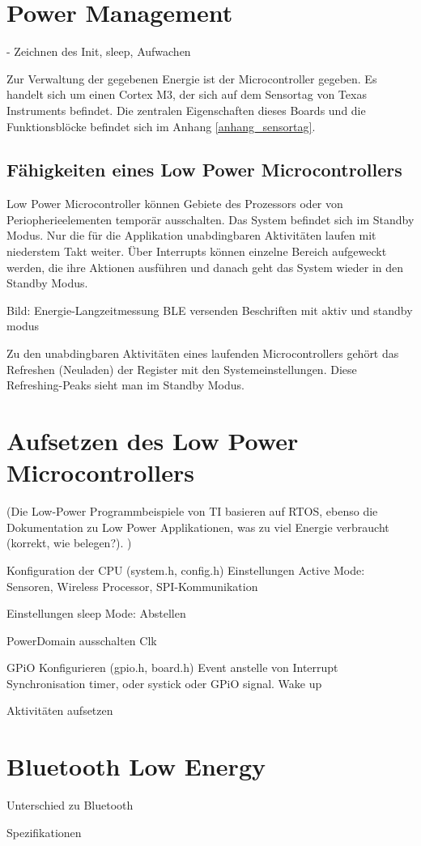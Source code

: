 \section{Power Management}\label{t_power_management} 
- Zeichnen des Init, sleep, Aufwachen

Zur Verwaltung der gegebenen Energie ist der Microcontroller gegeben. Es handelt sich um einen Cortex M3, der sich auf dem Sensortag von Texas Instruments befindet. Die zentralen Eigenschaften dieses Boards und die Funktionsblöcke befindet sich im Anhang \ref{anhang_sensortag}.

\subsection{Fähigkeiten eines Low Power Microcontrollers}
  
Low Power Microcontroller können Gebiete des Prozessors oder von Periopherieelementen temporär ausschalten. Das System befindet sich im Standby Modus. Nur die für die Applikation unabdingbaren Aktivitäten laufen mit niederstem Takt weiter. Über Interrupts können einzelne Bereich aufgeweckt werden, die ihre Aktionen ausführen und danach geht das System wieder in den Standby Modus.

Bild: Energie-Langzeitmessung BLE versenden
Beschriften mit aktiv und standby modus

Zu den unabdingbaren Aktivitäten eines laufenden Microcontrollers gehört das Refreshen (Neuladen) der Register mit den Systemeinstellungen. Diese Refreshing-Peaks sieht man im Standby Modus.



\section{Aufsetzen des Low Power Microcontrollers}
(Die Low-Power Programmbeispiele von TI basieren auf RTOS, ebenso die Dokumentation zu Low Power Applikationen, was zu viel Energie verbraucht (korrekt, wie belegen?). )

Konfiguration der CPU (system.h, config.h)
Einstellungen Active Mode: Sensoren, Wireless Processor, SPI-Kommunikation

Einstellungen sleep Mode: Abstellen

PowerDomain ausschalten
Clk

GPiO Konfigurieren (gpio.h, board.h)
Event anstelle von Interrupt
Synchronisation
timer, oder systick oder GPiO signal. Wake up

Aktivitäten aufsetzen






\section{Bluetooth Low Energy}\label{t_ble} 

Unterschied zu Bluetooth

Spezifikationen





